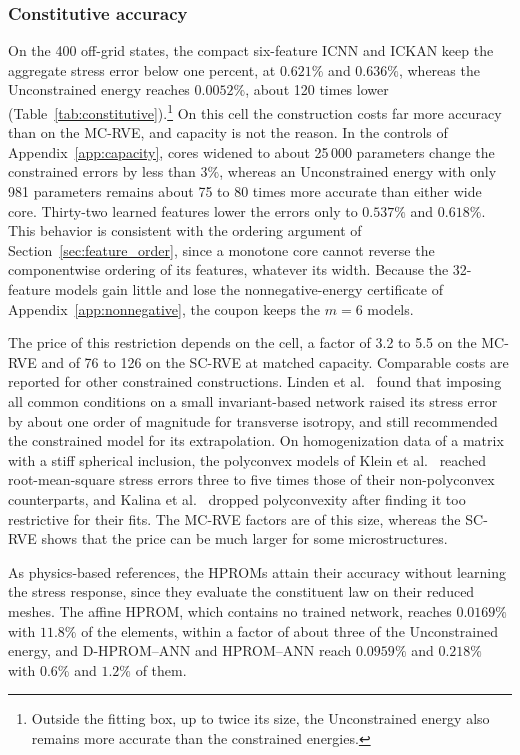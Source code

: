 \subsubsection{Constitutive accuracy}
\label{sec:constitutive_accuracy}
On the 400 off-grid states, the compact six-feature ICNN and ICKAN keep the aggregate stress error below one percent, at $0.621\%$ and $0.636\%$, whereas the Unconstrained energy reaches $0.0052\%$, about 120 times lower (Table~\ref{tab:constitutive}).\footnote{Outside the fitting box, up to twice its size, the Unconstrained energy also remains more accurate than the constrained energies.}  On this cell the construction costs far more accuracy than on the MC-RVE, and capacity is not the reason.  In the controls of Appendix~\ref{app:capacity}, cores widened to about 25\,000 parameters change the constrained errors by less than $3\%$, whereas an Unconstrained energy with only 981 parameters remains about 75 to 80 times more accurate than either wide core.  Thirty-two learned features lower the errors only to $0.537\%$ and $0.618\%$.  This behavior is consistent with the ordering argument of Section~\ref{sec:feature_order}, since a monotone core cannot reverse the componentwise ordering of its features, whatever its width.  Because the 32-feature models gain little and lose the nonnegative-energy certificate of Appendix~\ref{app:nonnegative}, the coupon keeps the $m=6$ models.

The price of this restriction depends on the cell, a factor of 3.2 to 5.5 on the MC-RVE and of 76 to 126 on the SC-RVE at matched capacity.  Comparable costs are reported for other constrained constructions.  Linden et al.~\cite{linden2023} found that imposing all common conditions on a small invariant-based network raised its stress error by about one order of magnitude for transverse isotropy, and still recommended the constrained model for its extrapolation.  On homogenization data of a matrix with a stiff spherical inclusion, the polyconvex models of Klein et al.~\cite{klein2026} reached root-mean-square stress errors three to five times those of their non-polyconvex counterparts, and Kalina et al.~\cite{Kalina2024} dropped polyconvexity after finding it too restrictive for their fits.  The MC-RVE factors are of this size, whereas the SC-RVE shows that the price can be much larger for some microstructures.

As physics-based references, the HPROMs attain their accuracy without learning the stress response, since they evaluate the constituent law on their reduced meshes. The affine HPROM, which contains no trained network, reaches $0.0169\%$ with $11.8\%$ of the elements, within a factor of about three of the Unconstrained energy, and D-HPROM--ANN and HPROM--ANN reach $0.0959\%$ and $0.218\%$ with $0.6\%$ and $1.2\%$ of them.

